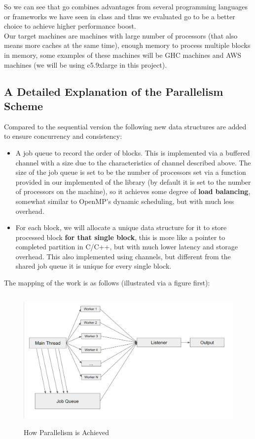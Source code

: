 \documentclass[12pt]{article}
\begin{document}
    So we can see that go combines advantages from several programming languages or frameworks we have seen in class and thus we evaluated go to be a better choice to achieve higher performance boost.\\
    Our target machines are machines with large number of processors (that also means more caches at the same time), enough memory to process multiple blocks in memory, some examples of these machines will be GHC machines and AWS machines (we will be using c5.9xlarge in this project).
    \subsection{A Detailed Explanation of the Parallelism Scheme}
    Compared to the sequential version the following new data structures are added to ensure concurrency and consistency:
    \begin{itemize}
        \item A job queue to record the order of blocks. This is implemented via a buffered channel with a size due to the characteristics of channel described above. The size of the job queue is set to be the number of processors set via a function provided in our implemented of the library (by default it is set to the number of processors on the machine), so it achieves some degree of \textbf{load balancing}, somewhat similar to OpenMP's dynamic scheduling, but with much less overhead.
        \item For each block, we will allocate a unique data structure for it to store processed block \textbf{for that single block}, this is more like a pointer to completed partition in C/C++, but with much lower latency and storage overhead. This also implemented using channels, but different from the shared job queue it is unique for every single block.
    \end{itemize}
    The mapping of the work is as follows (illustrated via a figure first):
    \begin{figure}[!h]
    \begin{center}
    \includegraphics[height=7cm]{Procedure.JPG}
    \caption{How Parallelism is Achieved}
    \end{center}
    \end{figure}
\end{document}
